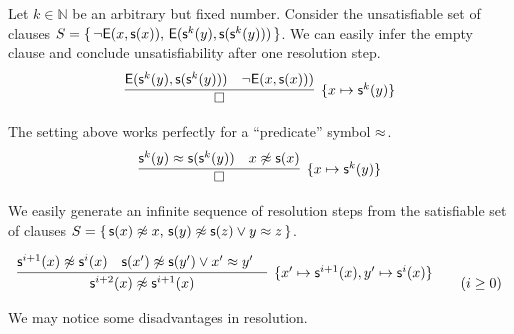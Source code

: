 \begin{example}
	Let \( k\in\mathbb{N} \) be an arbitrary but fixed number.
	Consider the unsatisfiable set of clauses
	\(
		S =
		 \{ \,
		{ \lnot\mathsf{E}(x, \mathsf{s}(x)) }, \,
		{ \mathsf{E}(\mathsf{s}^{k}(y), \mathsf{s}(\mathsf{s}^{k}(y)))}
		 \, \}
	 \).
	We can easily infer the empty clause and
	conclude unsatisfiability after one resolution step.
	\begin{gather*}
	\infer[ \{ x\mapsto\msucc^k(y)\}]{
		\square
	}{
		{ \mE(\msucc^k(y), \msucc(\msucc^k(y)))} &
		{ \lnot\mE(x, \msucc(x)))}
	}
	\end{gather*}
\end{example}



\begin{example}
	The setting above works perfectly for a “predicate” symbol \( \approx \).
	\begin{gather*}
	\infer[ \{ x\mapsto\msucc^k(y)\}]{
		\square
	}{
		\msucc^k(y) \mEQ \msucc(\msucc^k(y)) &
		x \mNE \msucc(x)
	}
	\end{gather*}
\end{example}

\begin{example}\label{ex:sat:msxx:mymzyz}
	We easily generate an infinite sequence of resolution steps from the satisfiable set of clauses
	\(
		S =
		 \{ \,
		\mathsf{s}(x)\not\approx x, \, \mathsf{s}(y)\not\approx\mathsf{s}(z) \lor y\approx z
		 \, \}
	 \).

	\begin{gather*}
	\infer
	[ \{ x'\mapsto\msucc^{i+1}(x), y'\mapsto\msucc^{i}(x)\}]
	{
		\msucc^{i+2}(x) \mNE\msucc^{i+1}(x)
	}{
		\msucc^{i+1}(x)\mNE \msucc^i(x) & \msucc(x')\mNE\msucc(y')\lor x'\mEQ y'
		&
	}
	\tag{\( i\geq 0 \)}
	\end{gather*}
\end{example}

\noindent We may notice some disadvantages in resolution.

